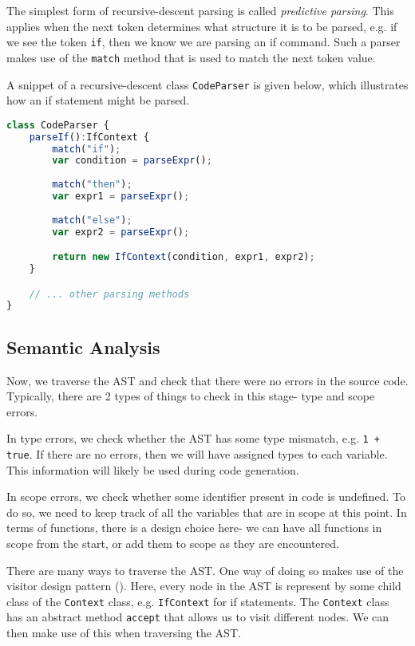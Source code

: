 The simplest form of recursive-descent parsing is called \emph{predictive parsing}. This applies when the next token determines what structure it is to be parsed, e.g. if we see the token \texttt{if}, then we know we are parsing an if command. Such a parser makes use of the \texttt{match} method that is used to match the next token value.

A snippet of a recursive-descent class \texttt{CodeParser} is given below, which illustrates how an if statement might be parsed.
\begin{lstlisting}[language=TypeScript]
class CodeParser {
    parseIf():IfContext {
        match("if");
        var condition = parseExpr();
        
        match("then");
        var expr1 = parseExpr();
        
        match("else");
        var expr2 = parseExpr();

        return new IfContext(condition, expr1, expr2);
    }

    // ... other parsing methods
}
\end{lstlisting}

\subsection{Semantic Analysis}
Now, we traverse the AST and check that there were no errors in the source code. Typically, there are 2 types of things to check in this stage- type and scope errors. 

In type errors, we check whether the AST has some type mismatch, e.g. \texttt{1 + true}. If there are no errors, then we will have assigned types to each variable. This information will likely be used during code generation.

In scope errors, we check whether some identifier present in code is undefined. To do so, we need to keep track of all the variables that are in scope at this point. In terms of functions, there is a design choice here- we can have all functions in scope from the start, or add them to scope as they are encountered. 

There are many ways to traverse the AST. One way of doing so makes use of the visitor design pattern (\cite{gamma1995design}). Here, every node in the AST is represent by some child class of the \texttt{Context} class, e.g. \texttt{IfContext} for if statements. The \texttt{Context} class has an abstract method \texttt{accept} that allows us to visit different nodes. We can then make use of this when traversing the AST.

